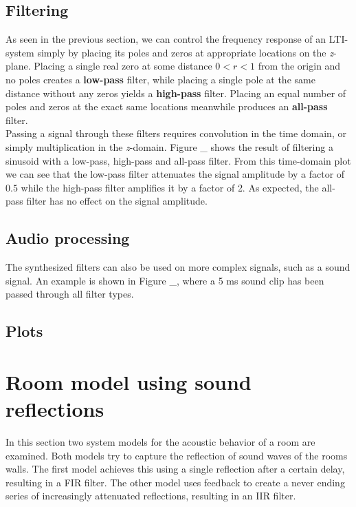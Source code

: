 \documentclass[journal]{IEEEtran}
\begin{document}
\subsection{Filtering} 
As seen in the previous section, we can control the frequency response of an LTI-system simply by placing its poles and zeros at appropriate locations on the \textit{z}-plane. Placing a single real zero at some distance $0<r<1$ from the origin and no poles creates a \textbf{low-pass} filter, while placing a single pole at the same distance without any zeros yields a \textbf{high-pass} filter. Placing an equal number of poles and zeros at the exact same locations meanwhile produces an \textbf{all-pass} filter. \\
Passing a signal through these filters requires convolution in the time domain, or simply multiplication in the \textit{z}-domain. Figure \_ shows the result of filtering a sinusoid with a low-pass, high-pass and all-pass filter. From this time-domain plot we can see that the low-pass filter attenuates the signal amplitude by a factor of $0.5$ while the high-pass filter amplifies it by a factor of 2. As expected, the all-pass filter has no effect on the signal amplitude. 

\subsection{Audio processing}
The synthesized filters can also be used on more complex signals, such as a sound signal. An example is shown in Figure \_, where a 5 ms sound clip has been passed through all filter types. 

\subsection{Plots}

\clearpage
\newpage

\section{Room model using sound reflections}

In this section two system models for the acoustic behavior of a room are examined. Both models try to capture the reflection of sound waves of the rooms walls. The first model achieves this using a single reflection after a certain delay, resulting in a FIR filter. The other model uses feedback to create a never ending series of increasingly attenuated reflections, resulting in an IIR filter.
\end{document}
